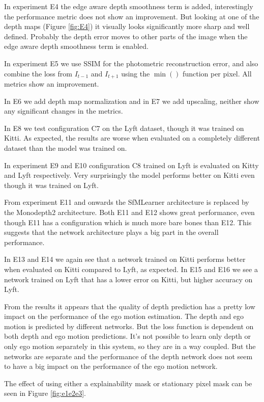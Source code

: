In experiment E4 the edge aware depth smoothness term is added, interestingly the performance metric does not show an improvement. But looking at one of the depth maps (Figure \ref{fig:E4}) it visually looks significantly more sharp and well defined. Probably the depth error moves to other parts of the image when the edge aware depth smoothness term is enabled.

In experiment E5 we use SSIM for the photometric reconstruction error, and also combine the loss from $I_{t-1}$ and $I_{t+1}$ using the $\min()$ function per pixel. All metrics show an improvement.

In E6 we add depth map normalization and in E7 we add upscaling, neither show any significant changes in the metrics.

In E8 we test configuration C7 on the Lyft dataset, though it was trained on Kitti. As expected, the results are worse when evaluated on a completely different dataset than the model was trained on.

In experiment E9 and E10 configuration C8 trained on Lyft is evaluated on Kitty and Lyft respectively. Very surprisingly the model performs better on Kitti even though it was trained on Lyft.

From experiment E11 and onwards the SfMLearner architecture is replaced by the Monodepth2 architecture. Both E11 and E12 shows great performance, even though E11 has a configuration which is much more bare bones than E12. This suggests that the network architecture plays a big part in the overall performance.

In E13 and E14 we again see that a network trained on Kitti performs better when evaluated on Kitti compared to Lyft, as expected. In E15 and E16 we see a network trained on Lyft that has a lower error on Kitti, but higher accuracy on Lyft.

From the results it appears that the quality of depth prediction has a pretty low impact on the performance of the ego motion estimation. The depth and ego motion is predicted by different networks. But the loss function is dependent on both depth and ego motion predictions. It's not possible to learn only depth or only ego motion separately in this system, so they are in a way coupled. But the networks are separate and the performance of the depth network does not seem to have a big impact on the performance of the ego motion network.

The effect of using either a explainability mask or stationary pixel mask can be seen in Figure \ref{fig:e1e2e3}.


